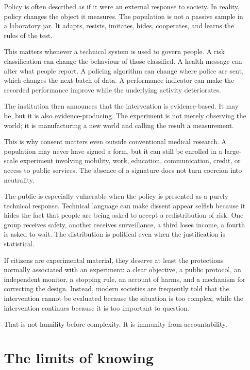 ﻿\documentclass[12pt,a4paper]{book}
\begin{document}
Policy is often described as if it were an external response to society. In
reality, policy changes the object it measures. The population is not a
passive sample in a laboratory jar. It adapts, resists, imitates, hides,
cooperates, and learns the rules of the test.

This matters whenever a technical system is used to govern people. A risk
classification can change the behaviour of those classified. A health message
can alter what people report. A policing algorithm can change where police are
sent, which changes the next batch of data. A performance indicator can make
the recorded performance improve while the underlying activity deteriorates.

The institution then announces that the intervention is evidence-based. It
may be, but it is also evidence-producing. The experiment is not merely
observing the world; it is manufacturing a new world and calling the result a
measurement.

This is why consent matters even outside conventional medical research. A
population may never have signed a form, but it can still be enrolled in a
large-scale experiment involving mobility, work, education, communication,
credit, or access to public services. The absence of a signature does not
turn coercion into neutrality.

The public is especially vulnerable when the policy is presented as a purely
technical response. Technical language can make dissent appear selfish because
it hides the fact that people are being asked to accept a redistribution of
risk. One group receives safety, another receives surveillance, a third loses
income, a fourth is asked to wait. The distribution is political even when the
justification is statistical.

If citizens are experimental material, they deserve at least the protections
normally associated with an experiment: a clear objective, a public protocol,
an independent monitor, a stopping rule, an account of harms, and a mechanism
for correcting the design. Instead, modern societies are frequently told that
the intervention cannot be evaluated because the situation is too complex,
while the intervention continues because it is too important to question.

That is not humility before complexity. It is immunity from accountability.

\section{The limits of knowing}
\end{document}
